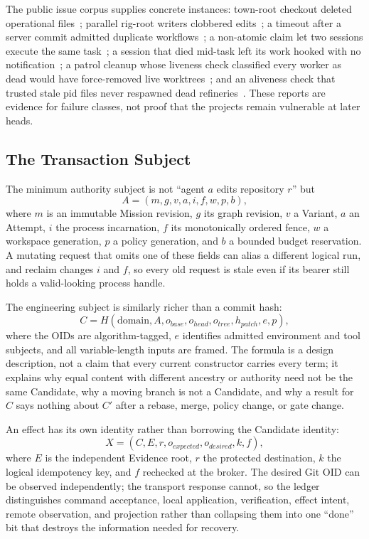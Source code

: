 \documentclass[journal]{IEEEtran}
\begin{document}
The public issue corpus supplies concrete instances: town-root checkout
deleted operational files~\cite{gastown4094}; parallel rig-root writers
clobbered edits~\cite{gascity1181}; a timeout after a server commit admitted
duplicate workflows~\cite{gascity5511}; a non-atomic claim let two sessions
execute the same task~\cite{gascity1052}; a session that died mid-task left
its work hooked with no notification~\cite{gastown3584}; a patrol cleanup
whose liveness check classified every worker as dead would have force-removed
live worktrees~\cite{gastown4737}; and an aliveness check that trusted stale
pid files never respawned dead refineries~\cite{gastown4091}. These reports
are evidence for failure classes, not proof that the projects remain
vulnerable at later heads.

\subsection{The Transaction Subject}

The minimum authority subject is not ``agent $a$ edits repository $r$'' but
\[
  A=(m,g,v,a,i,f,w,p,b),
\]
where $m$ is an immutable Mission revision, $g$ its graph revision, $v$ a
Variant, $a$ an Attempt, $i$ the process incarnation, $f$ its monotonically
ordered fence, $w$ a workspace generation, $p$ a policy generation, and $b$ a
bounded budget reservation. A mutating request that omits one of these fields
can alias a different logical run, and reclaim changes $i$ and $f$, so every
old request is stale even if its bearer still holds a valid-looking process
handle.

The engineering subject is similarly richer than a commit hash:
\[
 C=H(\mathrm{domain},A,o_{base},o_{head},o_{tree},h_{patch},e,p),
\]
where the OIDs are algorithm-tagged, $e$ identifies admitted environment and
tool subjects, and all variable-length inputs are framed. The formula is a
design description, not a claim that every current constructor carries every
term; it explains why equal content with different ancestry or authority need
not be the same Candidate, why a moving branch is not a Candidate, and why a
result for $C$ says nothing about $C'$ after a rebase, merge, policy change,
or gate change.

An effect has its own identity rather than borrowing the Candidate identity:
\[
 X=(C,E,r,o_{expected},o_{desired},k,f),
\]
where $E$ is the independent Evidence root, $r$ the protected destination, $k$
the logical idempotency key, and $f$ rechecked at the broker. The desired Git
OID can be observed independently; the transport response cannot, so the
ledger distinguishes command acceptance, local application, verification,
effect intent, remote observation, and projection rather than collapsing them
into one ``done'' bit that destroys the information needed for recovery.
\end{document}
